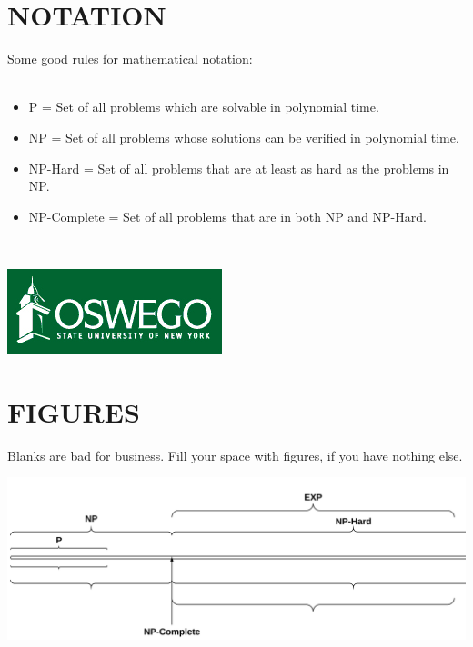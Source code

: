 \documentclass[landscape]{sciposter}
\begin{document}
\begin{multicols}{4}
\section{NOTATION}

Some good rules for mathematical notation:
\\
\\
\begin{itemize}
\item P = Set of all problems which are solvable in polynomial time.
\item NP = Set of all problems whose solutions can be verified in polynomial time.
\item NP-Hard = Set of all problems that are at least as hard as the problems in NP.
\item NP-Complete = Set of all problems that are in both NP and NP-Hard.
\end{itemize}

\

\begin{center}
\includegraphics[scale = 2.6]{oswegologo}
\end{center}


\section{FIGURES}
Blanks are bad for business. Fill your space with figures, if you have nothing else.


\begin{center}
\includegraphics[scale=.8]{Time_Complexity_Line.png}
\end{center}


\end{multicols}
\end{document}
